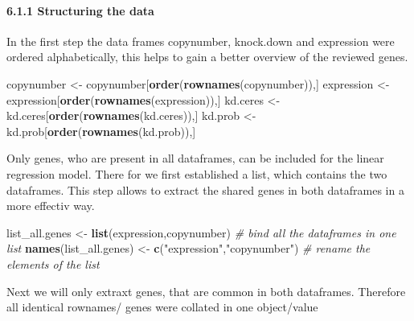 \documentclass[]{article}
\newenvironment{Shaded}{\begin{snugshade}}{\end{snugshade}}
\newcommand{\CommentTok}[1]{\textcolor[rgb]{0.56,0.35,0.01}{\textit{#1}}}
\newcommand{\ControlFlowTok}[1]{\textcolor[rgb]{0.13,0.29,0.53}{\textbf{#1}}}
\newcommand{\KeywordTok}[1]{\textcolor[rgb]{0.13,0.29,0.53}{\textbf{#1}}}
\newcommand{\NormalTok}[1]{#1}
\newcommand{\OperatorTok}[1]{\textcolor[rgb]{0.81,0.36,0.00}{\textbf{#1}}}
\newcommand{\StringTok}[1]{\textcolor[rgb]{0.31,0.60,0.02}{#1}}
\let\oldparagraph\paragraph
\renewcommand{\paragraph}[1]{\oldparagraph{#1}\mbox{}}
\begin{document}
\hypertarget{structuring-the-data}{%
\paragraph{6.1.1 Structuring the data}\label{structuring-the-data}}

In the first step the data frames copynumber, knock.down and expression
were ordered alphabetically, this helps to gain a better overview of the
reviewed genes.

\begin{Shaded}
\begin{Highlighting}[]
\NormalTok{copynumber <-}\StringTok{ }\NormalTok{copynumber[}\KeywordTok{order}\NormalTok{(}\KeywordTok{rownames}\NormalTok{(copynumber)),]}
\NormalTok{expression <-}\StringTok{ }\NormalTok{expression[}\KeywordTok{order}\NormalTok{(}\KeywordTok{rownames}\NormalTok{(expression)),]}
\NormalTok{kd.ceres <-}\StringTok{ }\NormalTok{kd.ceres[}\KeywordTok{order}\NormalTok{(}\KeywordTok{rownames}\NormalTok{(kd.ceres)),]}
\NormalTok{kd.prob <-}\StringTok{ }\NormalTok{kd.prob[}\KeywordTok{order}\NormalTok{(}\KeywordTok{rownames}\NormalTok{(kd.prob)),]}
\end{Highlighting}
\end{Shaded}

Only genes, who are present in all dataframes, can be included for the
linear regression model. There for we first established a list, which
contains the two dataframes. This step allows to extract the shared
genes in both dataframes in a more effectiv way.

\begin{Shaded}
\begin{Highlighting}[]
\NormalTok{list_all.genes <-}\StringTok{ }\KeywordTok{list}\NormalTok{(expression,copynumber) }\CommentTok{# bind all the dataframes in one list}
\KeywordTok{names}\NormalTok{(list_all.genes) <-}\StringTok{ }\KeywordTok{c}\NormalTok{(}\StringTok{"expression"}\NormalTok{,}\StringTok{"copynumber"}\NormalTok{) }\CommentTok{# rename the elements of the list}
\end{Highlighting}
\end{Shaded}

Next we will only extraxt genes, that are common in both dataframes.
Therefore all identical rownames/ genes were collated in one
object/value

\begin{Shaded}
\end{Shaded}
\end{document}
